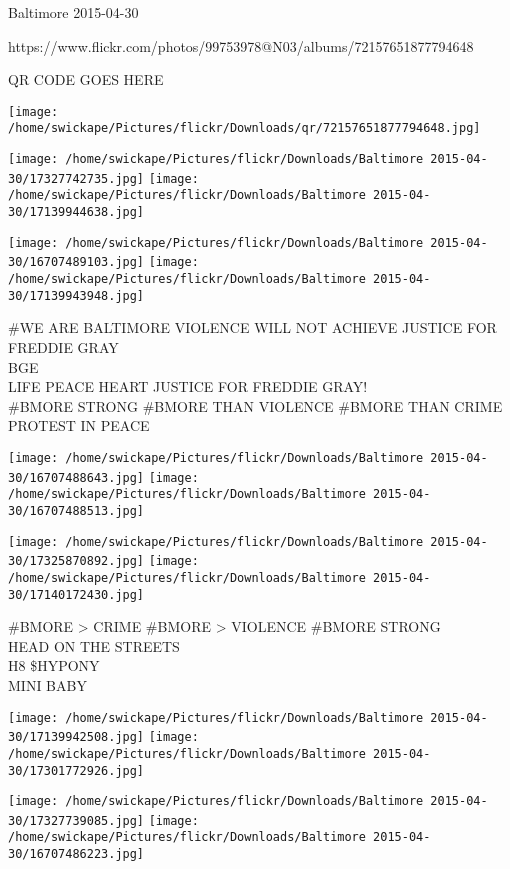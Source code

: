\documentclass[10pt,letterpaper]{article}
\begin{document}
Baltimore 2015-04-30

https://www.flickr.com/photos/99753978@N03/albums/72157651877794648

QR CODE GOES HERE

\texttt{[image: /home/swickape/Pictures/flickr/Downloads/qr/72157651877794648.jpg]}
\pagebreak

\texttt{[image: /home/swickape/Pictures/flickr/Downloads/Baltimore 2015-04-30/17327742735.jpg]}
\texttt{[image: /home/swickape/Pictures/flickr/Downloads/Baltimore 2015-04-30/17139944638.jpg]}

\texttt{[image: /home/swickape/Pictures/flickr/Downloads/Baltimore 2015-04-30/16707489103.jpg]}
\texttt{[image: /home/swickape/Pictures/flickr/Downloads/Baltimore 2015-04-30/17139943948.jpg]}

\#WE ARE BALTIMORE VIOLENCE WILL NOT ACHIEVE JUSTICE FOR FREDDIE GRAY\\
BGE\\
LIFE PEACE HEART JUSTICE FOR FREDDIE GRAY!\\
\#BMORE STRONG \#BMORE THAN VIOLENCE \#BMORE THAN CRIME PROTEST IN PEACE\\
\pagebreak

\texttt{[image: /home/swickape/Pictures/flickr/Downloads/Baltimore 2015-04-30/16707488643.jpg]}
\texttt{[image: /home/swickape/Pictures/flickr/Downloads/Baltimore 2015-04-30/16707488513.jpg]}

\texttt{[image: /home/swickape/Pictures/flickr/Downloads/Baltimore 2015-04-30/17325870892.jpg]}
\texttt{[image: /home/swickape/Pictures/flickr/Downloads/Baltimore 2015-04-30/17140172430.jpg]}

\#BMORE > CRIME \#BMORE > VIOLENCE \#BMORE STRONG\\
HEAD ON THE STREETS\\
H8 \$HYPONY\\
MINI BABY\\
\pagebreak

\texttt{[image: /home/swickape/Pictures/flickr/Downloads/Baltimore 2015-04-30/17139942508.jpg]}
\texttt{[image: /home/swickape/Pictures/flickr/Downloads/Baltimore 2015-04-30/17301772926.jpg]}

\texttt{[image: /home/swickape/Pictures/flickr/Downloads/Baltimore 2015-04-30/17327739085.jpg]}
\texttt{[image: /home/swickape/Pictures/flickr/Downloads/Baltimore 2015-04-30/16707486223.jpg]}
\end{document}

